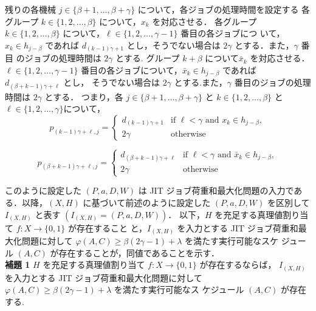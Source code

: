 \documentclass[12pt]{optlab-bachelor}
\begin{document}
残りの各機械 $j \in \{\beta + 1, \ldots , \beta + \gamma\}$ について，各ジョブの処理時間を設定する
各グループ $k \in \{1,2,\ldots,\beta\}$ について，$x_k$ を対応させる．
各グループ $k \in \{1,2,\ldots,\beta\}$ について，$\ell \in \{1,2,\ldots, \gamma - 1\}$ 番目の各ジョブにつ いて，$x_k \in h_{j - \beta}$ であれば $d_{(k - 1)\gamma + 1}$ とし，そうでない場合は $2\gamma$ とする．また，$\gamma$ 番目 のジョブの処理時間は $2\gamma$ とする.
グループ $k + \beta$ について$\bar x_k$ を対応させる．
$\ell \in \{1,2,\ldots, \gamma - 1\}$ 番目の各ジョブについて，$\bar x_k \in h_{j - \beta}$ であれば $d_{(\beta + k - 1)\gamma + \ell}$ とし， そうでない場合は $2\gamma$ とする.また，$\gamma$ 番目のジョブの処理時間は $2\gamma$ とする．
つまり，各 $j \in \{\beta + 1,\ldots, \beta + \gamma\}$ と $k \in
\{1,2,\ldots, \beta\}$ と $\ell \in \{1,2,\ldots, \gamma\}$について，
$$p_{(k - 1)\gamma + \ell, j} = \left\{ \begin{array}{ll} d_{(k - 1)\gamma + 1} & \text{if } \ell < \gamma \text{ and } x_k \in h_{j - \beta}, \\ 2\gamma & \text{otherwise} \end{array} \right.$$

$$p_{(\beta + k - 1)\gamma + \ell, j} = \left\{ \begin{array}{ll} d_{(\beta + k - 1)\gamma + \ell} & \text{if } \ell < \gamma \text{ and } \bar x_k \in h_{j - \beta}, \\ 2\gamma & \text{otherwise} \end{array} \right.$$

このように設定した $(P,a,D,W)$ は JIT ジョブ荷重和最大化問題の入力である．以降，$(X,H)$ に基づいて前述のように設定した $(P,a,D,W)$ を区別して $I_{(X,H)}$ と表す $(I_{(X,H)} = (P,a,D,W))$．
以下，$H$ を充足する真理値割り当て $f : X \to \{0,1\}$ が存在すること
と，$I_{(X,H)}$ を入力とする JIT ジョブ荷重和最大化問題に対して
$\varphi(A,C) \ge \beta(2\gamma - 1) + \lambda$ を満たす実行可能なスケ
ジュール $(A,C)$ が存在することが，同値であることを示す．\\

\noindent \textbf{補題 1}
$H$ を充足する真理値割り当て $f : X \to \{0,1\}$ が存在するならば，
$I_{(X,H)}$ を入力とする JIT ジョブ荷重和最大化問題に対して
$\varphi(A, C) \ge \beta(2\gamma - 1) + \lambda$ を満たす実行可能なス
ケジュール $(A, C)$ が存在する.\\ 
\end{document}
